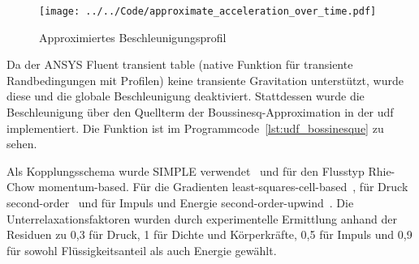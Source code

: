 \begin{figure}
  \centering
  \texttt{[image: ../../Code/approximate\_acceleration\_over\_time.pdf]}
  \caption{Approximiertes Beschleunigungsprofil}\label{fig:approximierte_beschleunigung}
\end{figure}

Da der ANSYS Fluent transient table (native Funktion für transiente Randbedingungen mit Profilen) keine transiente Gravitation
unterstützt, wurde diese und die globale Beschleunigung deaktiviert.
Stattdessen wurde die Beschleunigung über den Quellterm der Boussinesq-Approximation in der \ac{udf} implementiert. Die Funktion ist im
Programmcode~\ref{lst:udf_bossinesque} zu sehen.

Als Kopplungsschema wurde SIMPLE verwendet~\cite{akamcae-udf} und für den Flusstyp Rhie-Chow momentum-based. Für die Gradienten least-squares-cell-based~\cite{akamcae-udf}, für Druck second-order~\cite{akamcae-udf} und für Impuls und Energie
second-order-upwind~\cite{akamcae-udf}. Die Unterrelaxationsfaktoren wurden durch experimentelle Ermittlung anhand der Residuen zu 0,3 für Druck, 1 für Dichte
und Körperkräfte, 0,5 für Impuls und 0,9 für sowohl Flüssigkeitsanteil als auch Energie gewählt.

